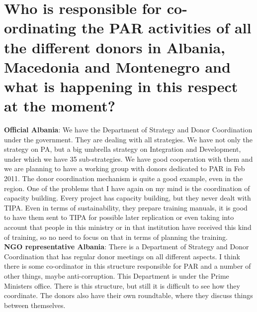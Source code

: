 \section{Who is responsible for co-ordinating the PAR activities of all the different donors in Albania, Macedonia and Montenegro and what is happening in this respect at the moment? }
\textbf{Official Albania}: We have the Department of Strategy and Donor Coordination under the government. They are dealing with all strategies. We have not only the strategy on PA, but a big umbrella strategy on Integration and Development, under which we have 35 sub-strategies. We have good cooperation with them and we are planning to have a working group with donors dedicated to PAR in Feb 2011. The donor coordination mechanism is quite a good example, even in the region. One of the problems that I have again on my mind is the coordination of capacity building. Every project has capacity building, but they never dealt with TIPA. Even in terms of sustainability, they prepare training manuals, it is good to have them sent to TIPA for possible later replication or even taking into account that people in this ministry or in that institution have received this kind of training, so no need to focus on that in terms of planning the training. \\
\textbf{NGO representative Albania}: There is a Department of Strategy and Donor Coordination that has regular donor meetings on all different aspects. I think there is some co-ordinator in this structure responsible for PAR and a number of other things, maybe anti-corruption. This Department is under the Prime Ministers office. There is this structure, but still it is difficult to see how they coordinate. The donors also have their own roundtable, where they discuss things between themselves.  
